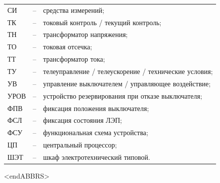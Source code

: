 \begin{longtable}{>{\raggedright\arraybackslash}m{2cm}>{\raggedright\arraybackslash}m{0.5cm}>{\raggedright\arraybackslash}m{20cm}}
СИ & -- & средства измерений; \\
ТК & -- & токовый контроль / текущий контроль; \\
ТН & -- & трансформатор напряжения; \\
ТО & -- & токовая отсечка; \\
ТТ & -- & трансформатор тока; \\
ТУ & -- & телеуправление / телеускорение / технические условия; \\
УВ & -- & управление выключателем / управляющее воздействие; \\
УРОВ & -- & устройство резервирования при отказе выключателя; \\
ФПВ & -- & фиксация положения выключателя; \\
ФСЛ & -- & фиксация состояния ЛЭП; \\
ФСУ & -- & функциональная схема устройства; \\
ЦП & -- & центральный процессор; \\
ШЭТ & -- & шкаф электротехнический типовой. \\
\end{longtable}
{\color{white}\fontsize{0.1pt}{0.1pt}\selectfont<endABBRS>}
